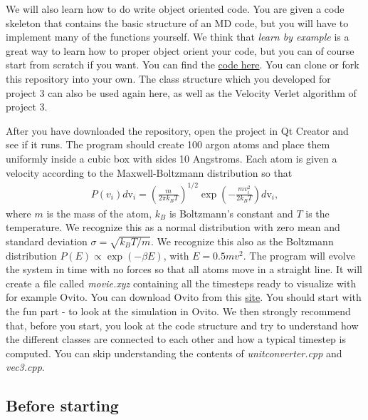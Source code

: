 \documentclass[%
oneside,                 %
final,                   %
10pt]{article}
\begin{document}
We will also learn how to do write object oriented code. You are given
a code skeleton that contains the basic structure of an MD code, but
you will have to implement many of the functions yourself. We think
that \emph{learn by example} is a great way to learn how to proper
object orient your code, but you can of course start from scratch if
you want. You can find the \href{{https://github.com/andeplane/molecular-dynamics-fys3150}}{code
here}. You
can clone or fork this repository into your own.  The class structure
which you developed for project 3 can also be used again here, as well
as the Velocity Verlet algorithm of project 3.


After you have downloaded the repository, open the project in Qt
Creator and see if it runs. The program should create 100 argon atoms
and place them uniformly inside a cubic box with sides 10
Angstroms. Each atom is given a velocity according to the
Maxwell-Boltzmann distribution so that
\begin{align} 
P(v_i)d\mathrm{v}_i = \left(\frac{m}{2\pi k_B
T}\right)^{1/2} \exp\left(-\frac{m v_i^2}{2k_B T}\right)d\mathrm{v}_i,
\end{align} 
where $m$ is the mass of the atom, $k_B$ is
Boltzmann's constant and $T$ is the temperature. We recognize this as
a normal distribution with zero mean and standard deviation $\sigma =
\sqrt{k_B T/m}$. We recognize this also as the Boltzmann distribution $P(E) \propto \exp{(-\beta E)}$, with $E = 0.5mv^2$.
The program will evolve the system in time with no
forces so that all atoms move in a straight line. It will create a
file called \emph{movie.xyz} containing all the timesteps ready to
visualize with for example Ovito. You can download Ovito from this \href{{http://www.ovito.org/index.php/download}}{site}. You should start
with the fun part - to look at the simulation in Ovito. We then
strongly recommend that, before you start, you look at the code
structure and try to understand how the different classes are
connected to each other and how a typical timestep is computed. You
can skip understanding the contents of \emph{unitconverter.cpp} and \emph{vec3.cpp}.



\subsection{Before starting}
\end{document}
